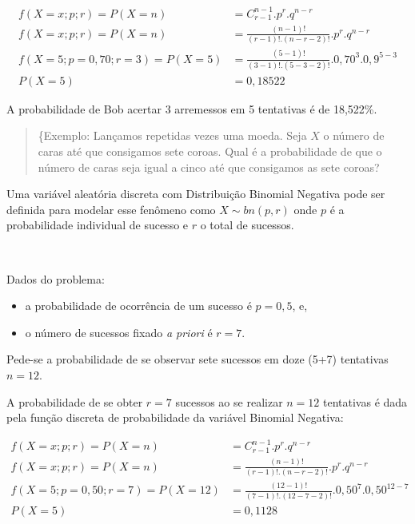 \documentclass[
]{book}
\providecommand{\tightlist}{%
  \setlength{\itemsep}{0pt}\setlength{\parskip}{0pt}}
\begin{document}
\hfill\break

\begin{align*}
f(X=x; p; r) = P(X=n) & = {C}_{r-1}^{n-1} . {p}^{r}. {q}^{n-r} \\
f(X=x; p; r) = P(X=n) & = \frac{(n-1)!}{ (r-1)!. (n-r-2)!} . {p}^{r}. {q}^{n-r} \\
f(X=5; p=0,70 ; r=3) = P(X=5) & = \frac{(5-1)!}{ (3-1)!. (5-3-2)!} . {0,70}^{3}. {0,9}^{5-3} \\
P(X=5) & = 0,18522
\end{align*}

A probabilidade de Bob acertar 3 arremessos em 5 tentativas é de 18,522\%.

\hfill\break

\begin{quote}
\{Exemplo: Lançamos repetidas vezes uma moeda. Seja \(X\) o número de caras até que consigamos sete coroas. Qual é a probabilidade de que o número de caras seja igual a cinco até que consigamos as sete coroas?
\end{quote}

\hfill\break

Uma variável aleatória discreta com Distribuição Binomial Negativa pode ser definida para modelar esse fenômeno como \(X\sim bn(p,r)\) onde \(p\) é a probabilidade individual de sucesso e \(r\) o total de sucessos.

~

Dados do problema:

\hfill\break

\begin{itemize}
\tightlist
\item
  a probabilidade de ocorrência de um sucesso é \(p=0,5\), e,\\
\item
  o número de sucessos fixado \emph{a priori} é \(r=7\).
\end{itemize}

\hfill\break

Pede-se a probabilidade de se observar sete sucessos em doze (5+7) tentativas \(n=12\).

\hfill\break

A probabilidade de se obter \(r=7\) sucessos ao se realizar \(n=12\) tentativas é dada pela função discreta de probabilidade da variável Binomial Negativa:

\begin{align*}
f(X=x; p; r) = P(X=n) & = {C}_{r-1}^{n-1} . {p}^{r}. {q}^{n-r} \\
f(X=x; p; r) = P(X=n) & = \frac{(n-1)!}{ (r-1)!. (n-r-2)!} . {p}^{r}. {q}^{n-r} \\
f(X=5; p=0,50 ; r=7) = P(X=12) & = \frac{(12-1)!}{ (7-1)!. (12-7-2)!} . {0,50}^{7}. {0,50}^{12-7} \\
P(X=5) & = 0,1128
\end{align*}
\end{document}
